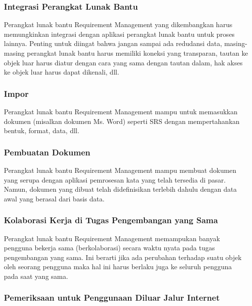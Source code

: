 \subsubsection{Integrasi Perangkat Lunak Bantu}
Perangkat lunak bantu Requirement Management yang dikembangkan harus memungkinkan integrasi dengan aplikasi perangkat lunak bantu untuk proses lainnya. Penting untuk diingat bahwa jangan sampai ada redudansi data, masing-masing perangkat lunak bantu harus memiliki koneksi yang transparan, tautan ke objek luar harus diatur dengan cara yang sama dengan tautan dalam, hak akses ke objek luar harus dapat dikenali, dll.

\subsubsection{Impor}
Perangkat lunak bantu Requirement Management mampu untuk memasukkan dokumen (misalkan dokumen  Ms. Word) seperti SRS dengan mempertahankan bentuk, format, data, dll.

\subsubsection{Pembuatan Dokumen}
Perangkat lunak bantu Requirement Management mampu membuat dokumen yang serupa dengan aplikasi pemrosesan kata yang telah tersedia di pasar. Namun, dokumen yang dibuat telah didefinisikan terlebih dahulu dengan data awal yang berasal dari basis data.

\subsubsection{Kolaborasi Kerja di Tugas Pengembangan yang Sama}
Perangkat lunak bantu Requirement Management memampukan banyak pengguna bekerja sama (berkolaborasi) secara waktu nyata pada tugas pengembangan yang sama. Ini berarti jika ada perubahan terhadap suatu objek oleh seorang pengguna maka hal ini harus berlaku juga ke seluruh pengguna pada saat yang sama.

\subsubsection{Pemeriksaan untuk Penggunaan Diluar Jalur Internet}

